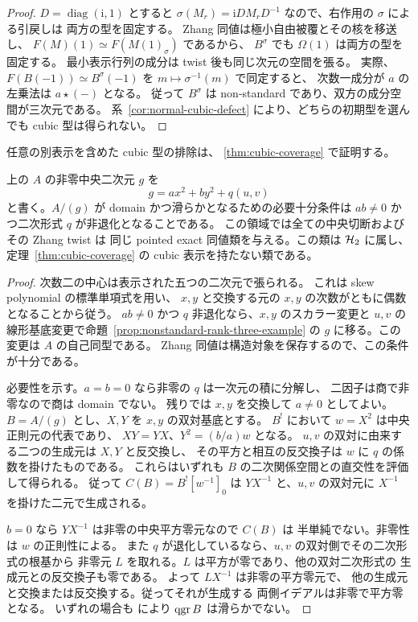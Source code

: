 \begin{proof}
$D=\operatorname{diag}(\mathrm i,1)$ とすると
$\sigma(M_r)=\mathrm i D M_r D^{-1}$ なので、右作用の $\sigma$ による引戻しは
両方の型を固定する。
Zhang 同値は極小自由被覆とその核を移送し、
$F(M)(1)\simeq F(M(1)_\sigma)$ であるから、
$B^\sigma$ でも $\Omega(1)$ は両方の型を固定する。
最小表示行列の成分は twist 後も同じ次元の空間を張る。
実際、$F(B(-1))\simeq B^\sigma(-1)$ を $m\mapsto\sigma^{-1}(m)$ で同定すると、
次数一成分が $a$ の左乗法は $a\star(-)$ となる。
従って $B^\sigma$ は non-standard であり、双方の成分空間が三次元である。
系~\ref{cor:normal-cubic-defect} により、どちらの初期型を選んでも
cubic 型は得られない。
\end{proof}

任意の別表示を含めた cubic 型の排除は、
\ref{thm:cubic-coverage} で証明する。

\begin{corollary}
\label{cor:skew-rank-three-central-locus}
上の $A$ の非零中央二次元 $g$ を
\[
 g=a x^2+b y^2+q(u,v)
\]
と書く。$A/(g)$ が domain かつ滑らかとなるための必要十分条件は
$ab\ne0$ かつ二次形式 $q$ が非退化となることである。
この領域では全ての中央切断およびその Zhang twist は
同じ pointed exact 同値類を与える。この類は $\mathcal H_2$ に属し、
定理~\ref{thm:cubic-coverage} の cubic 表示を持たない類である。
\end{corollary}

\begin{proof}
次数二の中心は表示された五つの二次元で張られる。
これは skew polynomial の標準単項式を用い、
$x,y$ と交換する元の $x,y$ の次数がともに偶数となることから従う。
$ab\ne0$ かつ $q$ 非退化なら、$x,y$ のスカラー変更と
$u,v$ の線形基底変更で命題~\ref{prop:nonstandard-rank-three-example} の
$g$ に移る。この変更は $A$ の自己同型である。
Zhang 同値は構造対象を保存するので、この条件が十分である。

必要性を示す。$a=b=0$ なら非零の $q$ は一次元の積に分解し、
二因子は商で非零なので商は domain でない。
残りでは $x,y$ を交換して $a\ne0$ としてよい。
$B=A/(g)$ とし、$X,Y$ を $x,y$ の双対基底とする。
$B^!$ において $w=X^2$ は中央正則元の代表であり、
$XY=YX$、$Y^2=(b/a)w$ となる。
$u,v$ の双対に由来する二つの生成元は $X,Y$ と反交換し、
その平方と相互の反交換子は $w$ に $q$ の係数を掛けたものである。
これらはいずれも $B$ の二次関係空間との直交性を評価して得られる。
従って $C(B)=B^![w^{-1}]_0$ は
$Y X^{-1}$ と、$u,v$ の双対元に $X^{-1}$ を掛けた二元で生成される。

$b=0$ なら $Y X^{-1}$ は非零の中央平方零元なので $C(B)$ は
半単純でない。非零性は $w$ の正則性による。
また $q$ が退化しているなら、$u,v$ の双対側でその二次形式の根基から
非零元 $L$ を取れる。$L$ は平方が零であり、他の双対二次形式の
生成元との反交換子も零である。
よって $L X^{-1}$ は非零の平方零元で、
他の生成元と交換または反交換する。従ってそれが生成する
両側イデアルは非零で平方零となる。
いずれの場合も \cite[Theorem 5.5]{MU2022} により $\operatorname{qgr} B$ は滑らかでない。
\end{proof}

